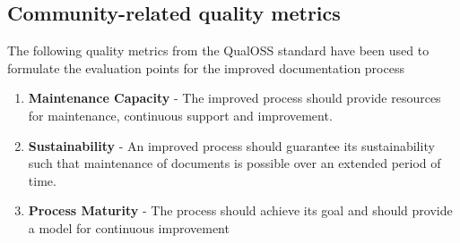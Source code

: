 \subsection{Community-related quality metrics} 
The following quality metrics from the QualOSS standard have been used to formulate the evaluation points for the improved documentation process \cite{5314237}
\begin{enumerate}
\item \textbf{Maintenance Capacity} - The improved process should provide resources for maintenance, continuous support and improvement.
\item \textbf{Sustainability} - An improved process should guarantee its sustainability such that maintenance of documents is possible over an extended period of time.
\item \textbf{Process Maturity} - The process should achieve its goal and should provide a model for continuous improvement
\end{enumerate}


